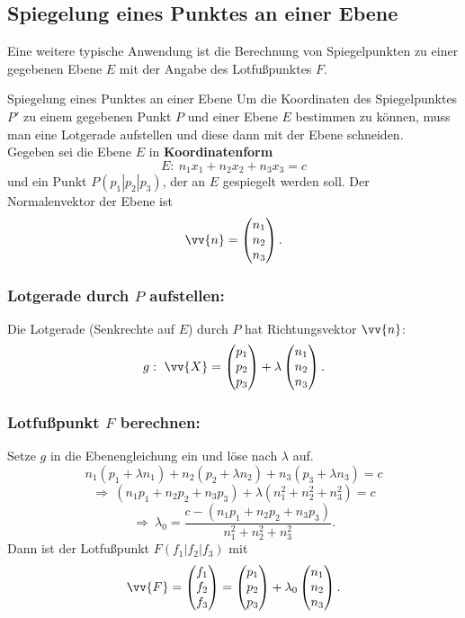  \subsection{Spiegelung eines Punktes an einer Ebene}
 Eine weitere typische Anwendung ist die Berechnung von Spiegelpunkten zu einer gegebenen Ebene \(E\) mit der Angabe des Lotfußpunktes \(F\).
 \begin{merke}{Spiegelung eines Punktes an einer Ebene}{}
  Um die Koordinaten des Spiegelpunktes \(P'\) zu einem gegebenen Punkt \(P\) und einer Ebene \(E\) bestimmen zu können, muss man eine Lotgerade aufstellen und diese dann mit der Ebene schneiden. \\
Gegeben sei die Ebene \(E\) in \textbf{Koordinatenform}
\[
E:\ n_1x_1+n_2x_2 + n_3x_3=c
\]
und ein Punkt $P(p_1|p_2|p_3)$, der an $E$ gespiegelt werden soll.
Der Normalenvektor der Ebene ist
\[
\vv{n}=\begin{pmatrix}n_1\\ n_2\\ n_3\end{pmatrix}.
\]
\medskip
\subsubsection*{Lotgerade durch $P$ aufstellen:}\quad
Die Lotgerade (Senkrechte auf $E$) durch $P$ hat Richtungsvektor $\vv{n}$:
\[
g:\ \vv{X}=
\begin{pmatrix}p_1\\p_2\\p_3\end{pmatrix}
+\lambda\begin{pmatrix}n_1\\n_2\\n_3\end{pmatrix}.
\]
\medskip
\subsubsection*{Lotfußpunkt $F$ berechnen:}\quad
Setze $g$ in die Ebenengleichung ein und löse nach $\lambda$ auf.
\[
n_1(p_1+\lambda n_1)+n_2(p_2+\lambda n_2)+n_3(p_3+\lambda n_3)=c
\]
\[
\Longrightarrow\ (n_1p_1+n_2p_2+n_3p_3)+\lambda(n_1^2+n_2^2+n_3^2)=c
\]
\[
\Longrightarrow\ \lambda_0=\frac{c-(n_1p_1+n_2p_2+n_3p_3)}{n_1^2+n_2^2+n_3^2}.
\]
Dann ist der Lotfußpunkt $F(f_1|f_2|f_3)$ mit
\[
\vv{F} =\begin{pmatrix}f_1\\f_2\\f_3\end{pmatrix}
=
\begin{pmatrix}p_1\\p_2\\p_3\end{pmatrix}
+\lambda_0\begin{pmatrix}n_1\\n_2\\n_3\end{pmatrix}.
\]


\end{merke}
